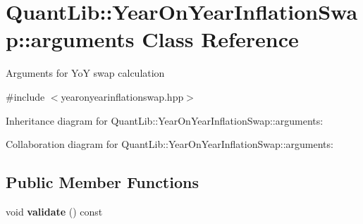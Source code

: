 \section{Quant\+Lib\+:\+:Year\+On\+Year\+Inflation\+Swap\+:\+:arguments Class Reference}
\label{class_quant_lib_1_1_year_on_year_inflation_swap_1_1arguments}


Arguments for YoY swap calculation  




{\ttfamily \#include $<$yearonyearinflationswap.\+hpp$>$}



Inheritance diagram for Quant\+Lib\+:\+:Year\+On\+Year\+Inflation\+Swap\+:\+:arguments\+:


Collaboration diagram for Quant\+Lib\+:\+:Year\+On\+Year\+Inflation\+Swap\+:\+:arguments\+:
\subsection*{Public Member Functions}
\begin{DoxyCompactItemize}
\item 
void {\bfseries validate} () const \label{class_quant_lib_1_1_year_on_year_inflation_swap_1_1arguments_a72abbaa702a03fdb2ac07d9034dcc314}

\end{DoxyCompactItemize}
